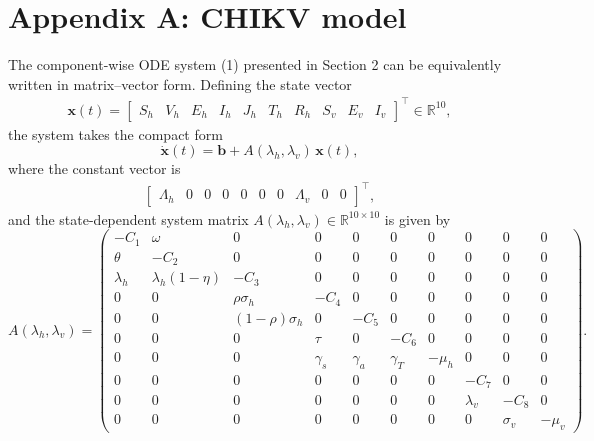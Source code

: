 \documentclass[9pt]{article}
\numberwithin{equation}{section}
\begin{document}
\section*{Appendix A: CHIKV model}\label{appendixA}
The component-wise ODE system (1) presented in Section 2 can be equivalently written in matrix--vector form. Defining the state vector
\begin{align}
\mathbf{x}(t)=
\begin{bmatrix}
S_h & V_h & E_h& I_h& J_h& T_h& R_h& S_v& E_v& I_v
\end{bmatrix}^\top\in\mathbb{R}^{10},
\end{align}
the system takes the compact form
\begin{equation}\label{eqnA1}
\dot{\mathbf{x}}(t)=\mathbf{b}+A(\lambda_h,\lambda_v)\,\mathbf{x}(t),
\end{equation}
where the constant vector is
\begin{align}
\begin{bmatrix}
\Lambda_h & 0& 0& 0& 0& 0& 0& \Lambda_v& 0& 0
\end{bmatrix}^\top,
\end{align}
and the state-dependent system matrix $A(\lambda_h,\lambda_v)\in\mathbb{R}^{10\times10}$ is given by
\begin{equation}
    A(\lambda_h,\lambda_v)=
    \begin{pmatrix}
        -C_1 & \omega & 0 & 0 & 0 & 0 & 0 & 0 & 0 & 0\\
        \theta & -C_2 & 0 & 0 & 0 & 0 & 0 & 0 & 0 & 0\\
        \lambda_h & \lambda_h(1-\eta) & -C_3 & 0 & 0 & 0 & 0 & 0 & 0 & 0\\
        0 & 0 & \rho\sigma_h & -C_4 & 0 & 0 & 0 & 0 & 0 & 0\\
        0 & 0 & (1-\rho)\sigma_h & 0 & -C_5 & 0 & 0 & 0 & 0 & 0\\
        0 & 0 & 0 & \tau & 0 & -C_6 & 0 & 0 & 0 & 0\\
        0 & 0 & 0 & \gamma_s & \gamma_a & \gamma_T & -\mu_h & 0 & 0 & 0\\
        0 & 0 & 0 & 0 & 0 & 0 & 0 & -C_7 & 0 & 0\\
        0 & 0 & 0 & 0 & 0 & 0 & 0 & \lambda_v & -C_8 & 0\\
        0 & 0 & 0 & 0 & 0 & 0 & 0 & 0 & \sigma_v & -\mu_v
    \end{pmatrix}.
\end{equation}
\end{document}
